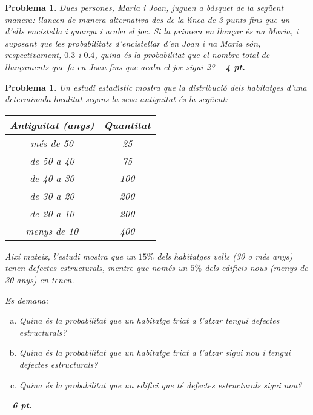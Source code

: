 \documentclass[a4paper,10pt]{article}
\newcounter{prbcont}
\newtheorem{problema}[prbcont]{Problema}
\begin{document}
\begin{problema}
Dues persones, Maria i Joan, juguen a b\`asquet de la següent manera: llancen de manera alternativa
des de la l\'\i nea de 3 punts fins que un d'ells encistella i guanya i acaba el joc. Si la primera en llançar \'es na Maria,
i suposant que les probabilitats d'encistellar d'en Joan i na Maria s\'on, respectivament, $0.3$ i $0.4$,
quina \'es la probabilitat que el nombre total de llançaments que fa en Joan fins que acaba el joc sigui 2?
\ \hfill{\textbf{ 4 pt.}}
\end{problema}

\vspace{0.5cm}

\begin{problema}
Un estudi estad\'\i stic mostra que la distribuci\'o dels habitatges d'una determinada localitat segons la seva antiguitat 
\'es la seg\"uent:

\begin{center}
\begin{tabular}{|c|c|}
\hline
Antiguitat (anys) & Quantitat \\
\hline
m\'es de 50 & 25 \\
de 50 a 40 & 75 \\
de 40 a 30 & 100 \\
de 30 a 20 & 200 \\
de 20 a 10 & 200 \\
menys de 10 & 400 \\
\hline
\end{tabular}
\end{center}

Aix\'i mateix, l'estudi mostra que un $15\%$ dels habitatges \textit{vells}  (30 o m\'es anys)  tenen defectes estructurals, mentre 
que nom\'es un $5\%$ dels edificis \textit{nous}  (menys de 30 anys)  en tenen.

Es demana:
\begin{enumerate}[a)]
\item Quina \'es la probabilitat que un habitatge triat a l'atzar tengui defectes estructurals?
\item Quina \'es la probabilitat que un habitatge triat a l'atzar sigui \textit{nou} i tengui defectes estructurals?
\item Quina \'es la probabilitat que un edifici que té defectes estructurals sigui \textit{nou}?
\end{enumerate}

\ \hfill{\textbf{ 6 pt.}}
\end{problema}
\end{document}
